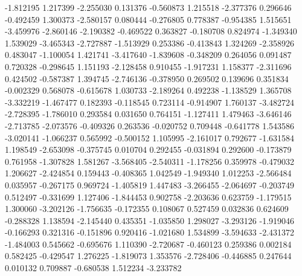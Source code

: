 -1.812195
1.217399
-2.255030
0.131376
-0.560873
1.215518
-2.377376
0.296646
-0.492459
1.300373
-2.580157
0.080444
-0.276805
0.778387
-0.954385
1.515651
-3.459976
-2.860146
-2.190382
-0.469522
0.363827
-0.180708
0.824974
-1.349340
1.539029
-3.465343
-2.727887
-1.513929
0.253386
-0.413843
1.324269
-2.358926
0.483047
-1.100054
1.421741
-3.417640
-1.839608
-0.348209
0.264056
0.091487
0.720328
-0.298645
1.151193
-2.128458
0.910455
-1.917231
1.158377
-2.311696
0.424502
-0.587387
1.394745
-2.746136
-0.378950
0.269502
0.139696
0.351834
-0.002329
0.568078
-0.615678
1.030733
-2.189264
0.492238
-1.138529
1.365708
-3.332219
-1.467477
0.182393
-0.118545
0.723114
-0.914907
1.760137
-3.482724
-2.728395
-1.786010
0.293584
0.031650
0.764151
-1.127411
1.479463
-3.646146
-2.713785
-2.073576
-0.409326
0.263536
-0.020752
0.709448
-0.641778
1.543586
-3.020141
-1.066237
0.565992
-0.500152
1.105995
-2.161017
0.792677
-1.631584
1.198549
-2.653098
-0.375745
0.010704
0.292455
-0.031894
0.292600
-0.173879
0.761958
-1.307828
1.581267
-3.568405
-2.540311
-1.178256
0.359978
-0.479032
1.206627
-2.424854
0.159443
-0.408365
1.042549
-1.949340
1.012253
-2.566484
0.035957
-0.267175
0.969724
-1.405819
1.447483
-3.266455
-2.064697
-0.203749
0.512497
-0.331699
1.127406
-1.844453
0.902758
-2.203636
0.623759
-1.179515
1.300060
-3.202126
-1.756635
-0.172355
0.108067
0.527459
0.032836
0.624609
-0.288328
1.138594
-2.145440
0.435351
-1.035850
1.298027
-3.293126
-1.919046
-0.166293
0.321316
-0.151896
0.920416
-1.021680
1.534899
-3.594633
-2.431372
-1.484003
0.545662
-0.695676
1.110390
-2.720687
-0.460123
0.259386
0.002184
0.582425
-0.429547
1.276225
-1.819073
1.353576
-2.728406
-0.446885
0.247644
0.010132
0.709887
-0.680538
1.512234
-3.233782
